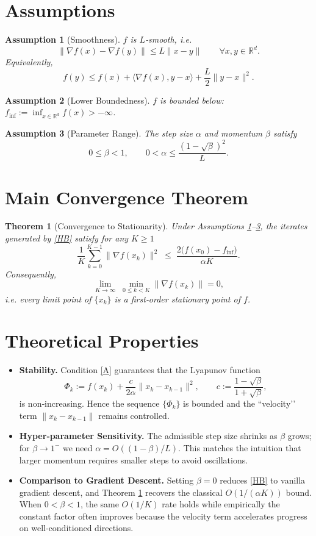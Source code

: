 \documentclass{article}
\newtheorem{theorem}{Theorem}
\newtheorem{assumption}{Assumption}
\begin{document}
\newpage
\section*{Assumptions}
\begin{assumption}[Smoothness]\label{ass:smooth}
$f$ is $L$‑smooth, i.e.
\[
\|\nabla f(x)-\nabla f(y)\|\le L\|x-y\|\qquad\forall x,y\in\mathbb{R}^{d}.
\]
Equivalently,
\[
f(y)\le f(x)+\langle\nabla f(x),y-x\rangle+\frac{L}{2}\|y-x\|^{2}.
\]
\end{assumption}

\begin{assumption}[Lower Boundedness]\label{ass:lower}
$f$ is bounded below: $\displaystyle f_{\inf}:=\inf_{x\in\mathbb{R}^{d}}f(x)>-\infty$.
\end{assumption}

\begin{assumption}[Parameter Range]\label{ass:param}
The step size $\alpha$ and momentum $\beta$ satisfy
\[
0\le\beta<1,\qquad 0<\alpha\le\frac{(1-\sqrt{\beta})^{2}}{L}.
\tag{A}
\]
\end{assumption}

\section*{Main Convergence Theorem}
\begin{theorem}[Convergence to Stationarity]\label{thm:main}
Under Assumptions \ref{ass:smooth}–\ref{ass:param}, the iterates generated by \eqref{HB} satisfy for any $K\ge 1$
\[
\frac{1}{K}\sum_{k=0}^{K-1}\|\nabla f(x_{k})\|^{2}
\;\le\;
\frac{2\bigl(f(x_{0})-f_{\inf}\bigr)}{\alpha K}.
\tag{1}
\]
Consequently,
\[
\lim_{K\to\infty}\;\min_{0\le k<K}\|\nabla f(x_{k})\|=0,
\]
i.e. every limit point of $\{x_{k}\}$ is a first‑order stationary point of $f$.
\end{theorem}

\section*{Theoretical Properties}
\begin{itemize}[leftmargin=*]
\item \textbf{Stability.} Condition \eqref{A} guarantees that the Lyapunov function
\[
\Phi_{k}:=f(x_{k})+\frac{c}{2\alpha}\|x_{k}-x_{k-1}\|^{2},
\qquad c:=\frac{1-\sqrt{\beta}}{1+\sqrt{\beta}},
\]
is non‑increasing. Hence the sequence $\{\Phi_{k}\}$ is bounded and the “velocity’’ term $\|x_{k}-x_{k-1}\|$ remains controlled.
\item \textbf{Hyper‑parameter Sensitivity.} The admissible step size shrinks as $\beta$ grows; for $\beta\to 1^{-}$ we need $\alpha=O((1-\beta)/L)$. This matches the intuition that larger momentum requires smaller steps to avoid oscillations.
\item \textbf{Comparison to Gradient Descent.} Setting $\beta=0$ reduces \eqref{HB} to vanilla gradient descent, and Theorem \ref{thm:main} recovers the classical $O(1/(\alpha K))$ bound. When $0<\beta<1$, the same $O(1/K)$ rate holds while empirically the constant factor often improves because the velocity term accelerates progress on well‑conditioned directions.
\end{itemize}
\end{document}
